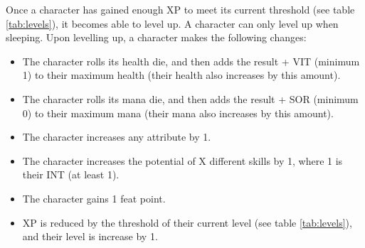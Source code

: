 \begin{multicols}{2}
    Once a character has gained enough XP to meet its current threshold (see table
    \ref{tab:levels}), it becomes able to level up. A character can only level
    up when sleeping. Upon levelling up, a character makes the following changes:
    \begin{itemize}
        \item The character rolls its health die, and then adds the result +
            VIT (minimum 1) to their maximum health (their health also increases by this
            amount).
        \item The character rolls its mana die, and then adds the result + SOR
            (minimum 0) to their maximum mana (their mana also increases by
            this amount).
        \item The character increases any attribute by 1.
        \item The character increases the potential of X different skills by 1,
            where 1 is their INT (at least 1).
        \item The character gains 1 feat point.
        \item XP is reduced by the threshold of their current level (see table
            \ref{tab:levels}), and their level is increase by 1.
    \end{itemize}
\end{multicols}
